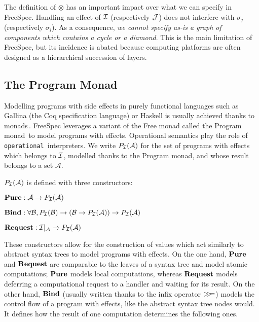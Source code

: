 The definition of $\otimes$ has an important impact over what we can specify in
FreeSpec.
%
%
Handling an effect of $\mathcal{I}$ (respectively $\mathcal{J}$) does not interfere with
$\sigma_j$ (respectively $\sigma_i$).
%
As a consequence, \emph{we cannot specify as-is a graph of components which
contains a cycle or a diamond}.
%
This is the main limitation of FreeSpec, but its incidence is abated because
computing platforms are often designed as a hierarchical succession of layers.

\subsection{The Program Monad}

Modelling programs with side effects in purely functional languages such as {\sc
Gallina} (the Coq specification language) or Haskell is usually achieved thanks
to monads\,\cite{hoareetal2001monad}.
%
FreeSpec leverages a variant of the Free monad called the Program
monad\,\cite{operational} to model programs with effects. Operational semantics
play the role of \texttt{operational}\,\cite{operational} interpreters.
%
We write $P_{\mathcal{I}}(\mathcal{A})$ for the set of programs with effects which
belongs to $\mathcal{I}$, modelled thanks to the Program monad, and whose result belongs
to a set $\mathcal{A}$.

\begin{definition}
  $P_{\mathcal{I}}(\mathcal{A})$ is defined with three constructors:
  \begin{compactitem}
  \item $\mathbf{\mathbf{Pure}} : \mathcal{A} \rightarrow P_{\mathcal{I}}(\mathcal{A})$
  \item
    $\mathbf{\mathbf{Bind}} : \forall \mathcal{B}, P_{\mathcal{I}}(\mathcal{B}) \rightarrow
    (\mathcal{B} \rightarrow P_{\mathcal{I}}(\mathcal{A})) \rightarrow
    P_{\mathcal{I}}(\mathcal{A})$
  \item
    $\mathbf{\mathbf{Request}} : \mathcal{I}|_{\mathcal{A}} \rightarrow
    P_{\mathcal{I}}(\mathcal{A})$
  \end{compactitem}
\end{definition}
%
These constructors allow for the construction of values which
act similarly to abstract syntax trees to model programs with effects.
%
On the one hand, $\mathbf{\mathbf{Pure}}$ and $\mathbf{\mathbf{Request}}$ are comparable to the
leaves of a syntax tree and model atomic computations; $\mathbf{\mathbf{Pure}}$ models
local computations, whereas $\mathbf{\mathbf{Request}}$ models deferring a computational
request to a handler and waiting for its result.
%
On the other hand, $\mathbf{\mathbf{Bind}}$ (usually written thanks to the infix operator
$>\!\!>\!\!=$) models the control flow of a program with effects, like the abstract
syntax tree nodes would.
%
It defines how the result of one computation determines the following ones.

